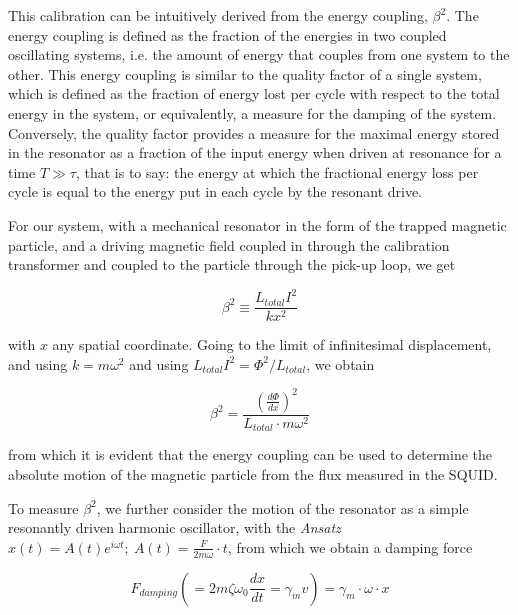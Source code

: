 \begin{appendices}
This calibration can be intuitively derived from the energy coupling, $\beta^2$. The energy coupling is defined as the fraction of the energies in two coupled oscillating systems, i.e. the amount of energy that couples from one system to the other. This energy coupling is similar to the quality factor of a single system, which is defined as the fraction of energy lost per cycle with respect to the total energy in the system, or equivalently, a measure for the damping of the system. Conversely, the quality factor provides a measure for the maximal energy stored in the resonator as a fraction of the input energy when driven at resonance for a time $T \gg \tau$, that is to say: the energy at which the fractional energy loss per cycle is equal to the energy put in each cycle by the resonant drive. 

For our system, with a mechanical resonator in the form of the trapped magnetic particle, and a driving magnetic field coupled in through the calibration transformer and coupled to the particle through the pick-up loop, we get 

\begin{equation}
    \beta^2 \equiv \frac{L_{total}I^2}{kx^2} 
\end{equation}

with $x$ any spatial coordinate. Going to the limit of infinitesimal displacement, and using $k =m\omega^2$ and using $L_{total}I^2 = \Phi^2/L_{total}$, we obtain

\begin{equation}
    \beta^2 = \frac{\left(\frac{d\Phi}{dx}\right)^2}{L_{total}\cdot m\omega^2}
\end{equation}

from which it is evident that the energy coupling can be used to determine the absolute motion of the magnetic particle from the flux measured in the SQUID.

To measure $\beta^2$, we further consider the motion of the resonator as a simple resonantly driven harmonic oscillator, with the \emph{Ansatz} $x(t) = A(t)e^{i\omega t};\ A(t) = \frac{F}{2 m \omega}\cdot t$, from which we obtain a damping force

\begin{equation}
    F_{damping} \left(= 2 m \zeta \omega_0 \frac{dx}{dt} = \gamma_m v \right)= \gamma_m \cdot\omega\cdot x
\end{equation}


\end{appendices}
